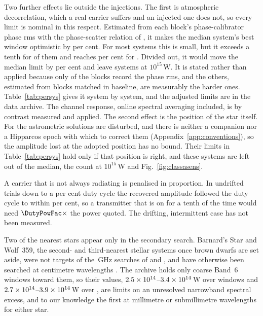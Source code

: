 Two further effects lie outside the injections. The first is atmospheric
decorrelation, which a real carrier suffers and an injected one does not, so
every limit is nominal in this respect. Estimated from each block's
phase-calibrator phase rms \citep[\S\S10.4.11, 11.3.1]{ALMAHandbook} with the
phase-scatter relation of \citet[Eq.~3]{Richards2022}, it makes the median
system's best window optimistic by \NmDecSysMedPct{} per cent. For most
systems this is small, but it exceeds a tenth for \NmDecNBigSys{} of them and
reaches \NmDecSysWorstPct{} per cent for \NmDecSysWorstName. Divided out, it
would move the median limit by \NmDecAdjShiftPct{} per cent and leave
\NmDecAdjNEfifteen{} systems at $10^{15}$\,W. It is stated rather than
applied because only \SensDecorNBlk{} of the \SensDecorNBlkTot{} blocks
record the phase rms, and the others, estimated from blocks matched in
baseline, are measurably the harder ones. Table~\ref{tab:persys} gives it
system by system, and the adjusted limits are in the data archive. The
channel response, online spectral averaging included, is by contrast
measured and applied. The second effect is the position of the star itself.
For \OmFlagStars{} the astrometric solutions are disturbed, and there is
neither a companion nor a Hipparcos epoch with which to correct them
(Appendix~\ref{app:conventions}), so the amplitude lost at the adopted
position has no bound. Their limits in Table~\ref{tab:persys} hold only if
that position is right, and these \OmNFlagWord{} systems are left out of the
median, the count at $10^{15}$\,W and Fig.~\ref{fig:classasens}.

A carrier that is not always radiating is penalised in proportion. In
\DutyNTrial{} undrifted trials down to a \DutyCycleMinPct{} per cent duty
cycle the recovered amplitude followed the duty cycle to within
\DutyAttenDevPct{} per cent, so a transmitter that is on for a tenth of the
time would need $\DutyPowFac\times$ the power quoted. The drifting,
intermittent case has not been measured.

Two of the nearest stars appear only in the secondary search. Barnard's Star and Wolf~359, the second-
and third-nearest stellar systems once brown dwarfs are set aside, were not
targets of the \SbPriorFreqGHz\,GHz searches of \citet{Steffes1994} and
\citet{Mauersberger1996}, and have otherwise been searched at centimetre
wavelengths \citep{Enriquez2017,Price2020,Margot2023}. The archive holds only
coarse Band~6 windows toward them, so their values,
$2.5\times10^{14}$--$3.4\times10^{14}$\,W over \NWinBarn{} windows and
$2.7\times10^{14}$--$3.9\times10^{14}$\,W over \NWinWolf, are limits on an
unresolved narrowband spectral excess, and to our knowledge the first at
millimetre or submillimetre wavelengths for either star.

